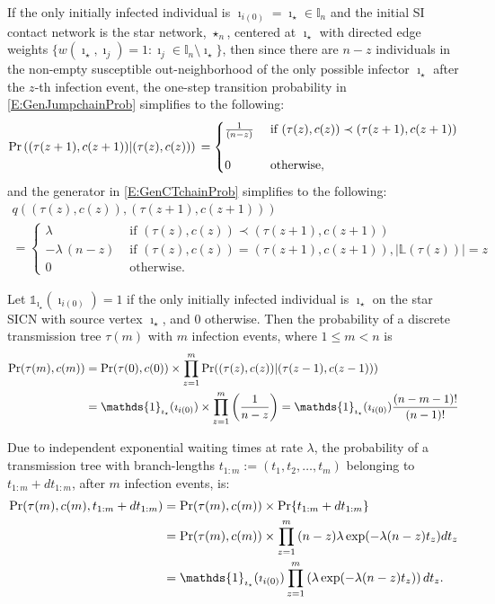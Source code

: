 \documentclass[review]{elsarticle}
\numberwithin{equation}{section}
\let\orgautoref\autoref
\renewcommand{\autoref}
        {\def\equationautorefname{Eq.}%
         \def\figureautorefname{Fig.}%
         \def\subfigureautorefname{Fig.}%
         \def\sectionautorefname{Sect.}%
         \def\subsectionautorefname{Sect.}%
         \def\subsubsectionautorefname{Sect.}%
         \def\Itemautorefname{item}%
         \def\tableautorefname{Table}%
         \def\propositionautorefname{Prop.}%
         \def\corollaryautorefname{Corollary}%
         \def\theoremautorefname{Theorem}%
         \def\remarkautorefname{Remark}%
         \def\lemmaautorefname{Lemma}%
         \def\proofofautorefname{Proof}%
         \def\exampleautorefname{Example}%
         \orgautoref}
\newcommand{\bI}{{\mathbb I}}
\newcommand{\bL}{{\mathbb L}}
\begin{document}
If the only initially infected individual is $\imath_{i(0)}=\imath_{\star} \in \bI_n$ 
and the initial SI contact network is the star network, $\star_n$, 
centered at $\imath_{\star}$ with directed edge weights
$\{w(\imath_{\star},\imath_j)=1: \imath_j \in \bI_n \setminus \imath_{\star}\}$, 
then since there are $n-z$ individuals in the non-empty susceptible out-neighborhood of the only 
possible infector $\imath_{\star}$ after the $z$-th infection event, 
the one-step transition probability in \autoref{E:GenJumpchainProb} simplifies to the following:
\begin{equation}\label{E:GenJumpchainProbsn}
\Pr\left( (\tau(z+1),c(z+1)) | (\tau(z),c(z)) \right)\\
=
\begin{cases}
\frac{1}{(n-z)}
& \text{ if } (\tau(z),c(z)) \prec (\tau(z+1),c(z+1))\\\\
0 & \text{ otherwise},
\end{cases}
\end{equation}
and the generator in \autoref{E:GenCTchainProb} simplifies to the following:
\begin{multline}\label{E:GenCTchainProbsn}
q\left( (\tau(z),c(z)), (\tau(z+1),c(z+1)) \right)\\
=
\begin{cases}
\lambda 
& \text{ if } (\tau(z),c(z))  \prec (\tau(z+1),c(z+1))\\
-\lambda \, (n-z) 
& \text{ if } (\tau(z),c(z)) = (\tau(z+1),c(z+1)), |\bL(\tau(z))|=z\\
0 & \text{ otherwise}.
\end{cases}
\end{multline}

Let $\mathds{1}_{\imath_{\star}}(\imath_{i(0)})=1$ if the only initially infected individual is $\imath_{\star}$ on the star SICN with source vertex $\imath_{\star}$, and $0$ otherwise.  
Then the probability of a discrete transmission tree $\tau(m)$ with $m$ infection events, where $1\leq m < n$ is
\begin{align}\label{E:GenCTchainProbrsnTree}
\Pr(\tau(m),c(m)) 
&= \Pr(\tau(0),c(0)) \times \prod_{z=1}^m \Pr((\tau(z),c(z)) | (\tau(z-1),c(z-1)) ) \notag\\
&= \mathds{1}_{\imath_{\star}}(\imath_{i(0)}) \times \prod_{z=1}^{m} \left( \frac{1}{n-z}\right) = \mathds{1}_{\imath_{\star}}(\imath_{i(0)}) \frac{(n-m-1)!}{(n-1)!}
\end{align}

Due to independent exponential waiting times at rate $\lambda$, the probability of a transmission tree with branch-lengths 
$t_{1:m} := (t_1,t_2,\ldots,t_m)$ belonging to $t_{1:m}+dt_{1:m}$, after $m$ infection events, is:
\begin{align}
\Pr(\tau(m),c(m),t_{1:m}+dt_{1:m}) 
&= \Pr(\tau(m),c(m)) \times \Pr\{ t_{1:m}+dt_{1:m} \} \notag \\
&=  \Pr(\tau(m),c(m)) \times \prod_{z=1}^m {(n-z)} \lambda \exp(-\lambda (n-z) t_z) dt_z \notag \\
&= \mathds{1}_{\imath_{\star}}(\imath_{i(0)}) \prod_{z=1}^m \left(\lambda \exp(-\lambda (n-z) t_z) \right)dt_z .
\end{align}
\end{document}
